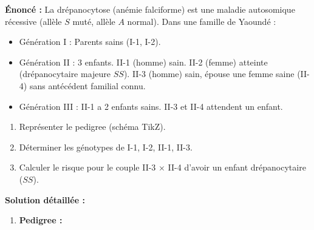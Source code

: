 \documentclass[11pt]{article}
\begin{document}
\begin{exoresolu}
    \textbf{Énoncé :} La drépanocytose (anémie falciforme) est une maladie autosomique récessive (allèle $S$ muté, allèle $A$ normal). Dans une famille de Yaoundé :
    \begin{itemize}
        \item Génération I : Parents sains (I-1, I-2).
        \item Génération II : 3 enfants. II-1 (homme) sain. II-2 (femme) atteinte (drépanocytaire majeure $SS$). II-3 (homme) sain, épouse une femme saine (II-4) sans antécédent familial connu.
        \item Génération III : II-1 a 2 enfants sains. II-3 et II-4 attendent un enfant.
    \end{itemize}
    \begin{enumerate}
        \item Représenter le pedigree (schéma TikZ).
        \item Déterminer les génotypes de I-1, I-2, II-1, II-3.
        \item Calculer le risque pour le couple II-3 $\times$ II-4 d'avoir un enfant drépanocytaire ($SS$).
    \end{enumerate}
    \tcblower
    \textbf{Solution détaillée :}
    \begin{enumerate}
        \item \textbf{Pedigree :}
        \begin{popfigure}

\end{popfigure}
\end{enumerate}
\end{exoresolu}
\end{document}
